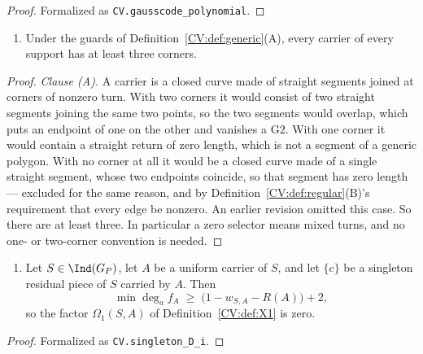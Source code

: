 \begin{proof}\leanok{}
Formalized as \texttt{CV.gausscode\_polynomial}.
\end{proof}

\begin{lemma}\label{CV:selector_A}\leanok
\begin{enumerate}
\item[(A)] Under the guards of Definition~\ref{CV:def:generic}(A), every carrier of every
support has at least three corners.
\end{enumerate}
\end{lemma}
\begin{proof}\leanok{}
\emph{Clause (A).} A carrier is a closed curve made of straight segments joined at corners of
nonzero turn. With two corners it would consist of two straight segments
joining the same two points, so the two segments would overlap, which puts an
endpoint of one on the other and vanishes a $\mathrm{G2}$. With one corner it
would contain a straight return of zero length, which is not a segment of a
generic polygon. With no corner at all it would be a closed curve made of a
single straight segment, whose two endpoints coincide, so that segment has zero
length --- excluded for the same reason, and by
Definition~\ref{CV:def:regular}(B)'s requirement that every edge be nonzero. An
earlier revision omitted this case. So there are at least three. In particular a zero selector
means mixed turns, and no one- or two-corner convention is needed.
\end{proof}

\begin{clause}[CV:singleton_D_i]\label{CV:singleton_D_i}\leanok
\begin{enumerate}
\item[(i)] Let $S\in\Ind(G_P)$, let $A$ be a uniform carrier of $S$, and let $\{c\}$ be a
singleton residual piece of $S$ carried by $A$. Then
\[
   \min\deg_af_A\;\geq\;\bigl(1-w_{S,A}-R(A)\bigr)+2,
\]
so the factor $\Omega_1(S,A)$ of Definition~\ref{CV:def:X1} is zero.
\end{enumerate}
\end{clause}
\begin{proof}\leanok{}
Formalized as \texttt{CV.singleton\_D\_i}.
\end{proof}

